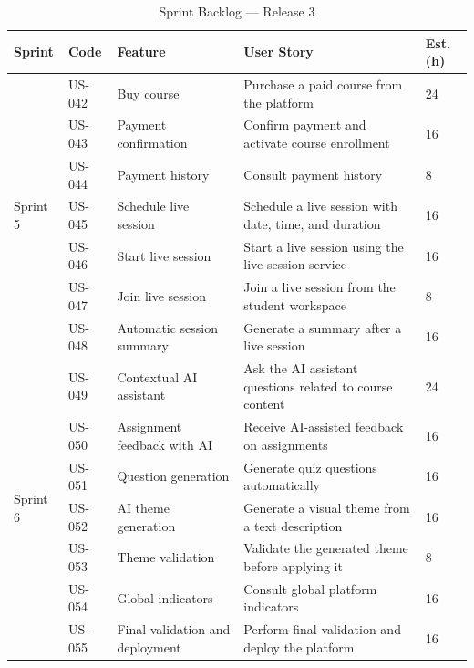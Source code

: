 \begin{table}[H]
\centering
\caption{Sprint Backlog — Release 3}
\label{tab:backlog_r3}
\renewcommand{\arraystretch}{1.25}
\footnotesize
\begin{tabularx}{\textwidth}{|p{1.4cm}|p{1.5cm}|p{2.8cm}|p{6.8cm}|p{1.5cm}|}
\hline
\textbf{Sprint} & \textbf{Code} & \textbf{Feature} & \textbf{User Story} & \textbf{Est. (h)} \\
\hline
\multirow{7}{*}{Sprint 5}
  & US-042 & Buy course & Purchase a paid course from the platform & 24 \\
  \cline{2-5}
  & US-043 & Payment confirmation & Confirm payment and activate course enrollment & 16 \\
  \cline{2-5}
  & US-044 & Payment history & Consult payment history & 8 \\
  \cline{2-5}
  & US-045 & Schedule live session & Schedule a live session with date, time, and duration & 16 \\
  \cline{2-5}
  & US-046 & Start live session & Start a live session using the live session service & 16 \\
  \cline{2-5}
  & US-047 & Join live session & Join a live session from the student workspace & 8 \\
  \cline{2-5}
  & US-048 & Automatic session summary & Generate a summary after a live session & 16 \\
\hline
\multirow{7}{*}{Sprint 6}
  & US-049 & Contextual AI assistant & Ask the AI assistant questions related to course content & 24 \\
  \cline{2-5}
  & US-050 & Assignment feedback with AI & Receive AI-assisted feedback on assignments & 16 \\
  \cline{2-5}
  & US-051 & Question generation & Generate quiz questions automatically & 16 \\
  \cline{2-5}
  & US-052 & AI theme generation & Generate a visual theme from a text description & 16 \\
  \cline{2-5}
  & US-053 & Theme validation & Validate the generated theme before applying it & 8 \\
  \cline{2-5}
  & US-054 & Global indicators & Consult global platform indicators & 16 \\
  \cline{2-5}
  & US-055 & Final validation and deployment & Perform final validation and deploy the platform & 16 \\
\hline
\end{tabularx}
\end{table}

